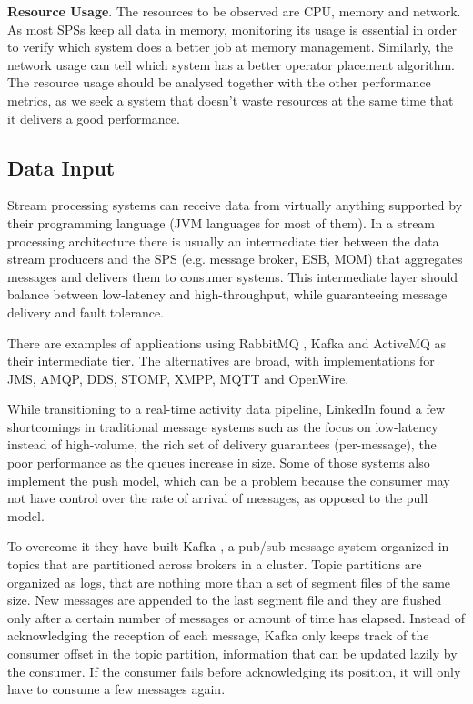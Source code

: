 \documentclass[ppgc,diss,english]{iiufrgs}
\begin{document}
\textbf{Resource Usage}. The resources to be observed are CPU, memory and network. As most SPSs keep all data in memory, monitoring its usage is essential in order to verify which system does a better job at memory management. Similarly, the network usage can tell which system has a better operator placement algorithm. The resource usage should be analysed together with the other performance metrics, as we seek a system that doesn't waste resources at the same time that it delivers a good performance.

\subsection{Data Input}

Stream processing systems can receive data from virtually anything supported by their programming language (JVM languages for most of them). In a stream processing architecture there is usually \cite{chardonnens2013big, lim2013execution, wang2013cluster, sawant2013big} an intermediate tier between the data stream producers and the SPS (e.g. message broker, ESB, MOM) that aggregates messages and delivers them to consumer systems. This intermediate layer should balance between low-latency and high-throughput, while guaranteeing message delivery and fault tolerance.

There are examples of applications using RabbitMQ \cite{yang2013big, bumgardner2014scalable}, Kafka \cite{chardonnens2013big, lim2013execution, wang2013cluster} and ActiveMQ \cite{appel2012eventlets, krawczyk2011basic} as their intermediate tier. The alternatives are broad, with implementations for JMS, AMQP, DDS, STOMP, XMPP, MQTT and OpenWire.

While transitioning to a real-time activity data pipeline, LinkedIn \cite{goodhope2012building} found a few shortcomings in traditional message systems such as the focus on low-latency instead of high-volume, the rich set of delivery guarantees (per-message), the poor performance as the queues increase in size. Some of those systems also implement the push model, which can be a problem because the consumer may not have control over the rate of arrival of messages, as opposed to the pull model.

To overcome it they have built Kafka \cite{kreps2011kafka}, a pub/sub message system organized in topics that are partitioned across brokers in a cluster. Topic partitions are organized as logs, that are nothing more than a set of segment files of the same size. New messages are appended to the last segment file and they are flushed only after a certain number of messages or amount of time has elapsed. Instead of acknowledging the reception of each message, Kafka only keeps track of the consumer offset in the topic partition, information that can be updated lazily by the consumer. If the consumer fails before acknowledging its position, it will only have to consume a few messages again.
\end{document}

